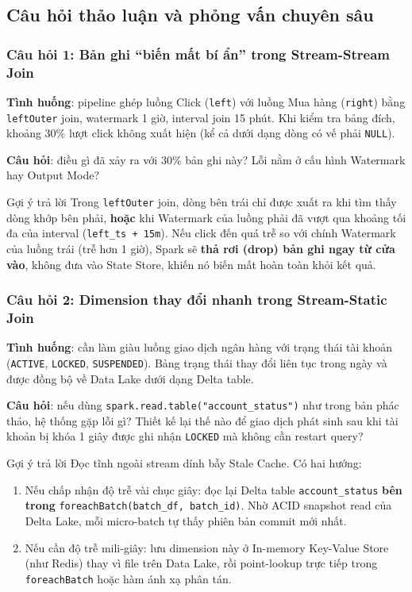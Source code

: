 \documentclass[12pt]{article}
\begin{document}
\subsection{Câu hỏi thảo luận và phỏng vấn chuyên sâu}

\subsubsection{Câu hỏi 1: Bản ghi ``biến mất bí ẩn'' trong Stream-Stream Join}

\textbf{Tình huống}: pipeline ghép luồng Click (\texttt{left}) với luồng Mua hàng (\texttt{right}) bằng \texttt{leftOuter} join, watermark 1 giờ, interval join 15 phút. Khi kiểm tra bảng đích, khoảng 30\% lượt click không xuất hiện (kể cả dưới dạng dòng có vế phải \texttt{NULL}).

\textbf{Câu hỏi}: điều gì đã xảy ra với 30\% bản ghi này? Lỗi nằm ở cấu hình Watermark hay Output Mode?

\begin{examplebox}{Gợi ý trả lời}
Trong \texttt{leftOuter} join, dòng bên trái chỉ được xuất ra khi tìm thấy dòng khớp bên phải, \textbf{hoặc} khi Watermark của luồng phải đã vượt qua khoảng tối đa của interval (\texttt{left\_ts + 15m}). Nếu click đến quá trễ so với chính Watermark của luồng trái (trễ hơn 1 giờ), Spark sẽ \textbf{thả rơi (drop) bản ghi ngay từ cửa vào}, không đưa vào State Store, khiến nó biến mất hoàn toàn khỏi kết quả.
\end{examplebox}

\subsubsection{Câu hỏi 2: Dimension thay đổi nhanh trong Stream-Static Join}

\textbf{Tình huống}: cần làm giàu luồng giao dịch ngân hàng với trạng thái tài khoản (\texttt{ACTIVE}, \texttt{LOCKED}, \texttt{SUSPENDED}). Bảng trạng thái thay đổi liên tục trong ngày và được đồng bộ về Data Lake dưới dạng Delta table.

\textbf{Câu hỏi}: nếu dùng \texttt{spark.read.table("account\_status")} như trong bản phác thảo, hệ thống gặp lỗi gì? Thiết kế lại thế nào để giao dịch phát sinh sau khi tài khoản bị khóa 1 giây được ghi nhận \texttt{LOCKED} mà không cần restart query?

\begin{examplebox}{Gợi ý trả lời}
Đọc tĩnh ngoài stream dính bẫy Stale Cache. Có hai hướng:
\begin{enumerate}
    \item Nếu chấp nhận độ trễ vài chục giây: đọc lại Delta table \texttt{account\_status} \textbf{bên trong} \texttt{foreachBatch(batch\_df, batch\_id)}. Nhờ ACID snapshot read của Delta Lake, mỗi micro-batch tự thấy phiên bản commit mới nhất.
    \item Nếu cần độ trễ mili-giây: lưu dimension này ở In-memory Key-Value Store (như Redis) thay vì file trên Data Lake, rồi point-lookup trực tiếp trong \texttt{foreachBatch} hoặc hàm ánh xạ phân tán.
\end{enumerate}
\end{examplebox}
\end{document}
